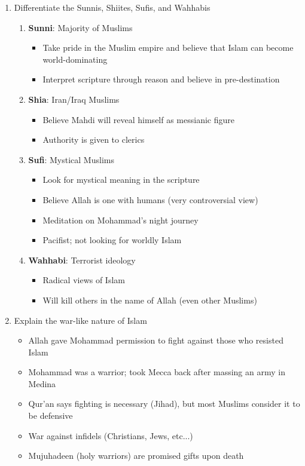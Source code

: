 \documentclass[8pt]{article}
\begin{document}
\begin{enumerate}
        \item Differentiate the Sunnis, Shiites, Sufis, and Wahhabis
            \begin{enumerate}
                \item \textbf{Sunni}: Majority of Muslims
                \begin{itemize}
                    \item Take pride in the Muslim empire and believe that Islam can become world-dominating
                    \item Interpret scripture through reason and believe in pre-destination
                \end{itemize}
                \item \textbf{Shia}: Iran/Iraq Muslims
                \begin{itemize}
                    \item Believe Mahdi will reveal himself as messianic figure
                    \item Authority is given to clerics
                \end{itemize}
                \item \textbf{Sufi}: Mystical Muslims
                \begin{itemize}
                    \item Look for mystical meaning in the scripture
                    \item Believe Allah is one with humans (very controversial view)
                    \item Meditation on Mohammad's night journey
                    \item Pacifist; not looking for worldly Islam
                \end{itemize}
                \item \textbf{Wahhabi}: Terrorist ideology
                \begin{itemize}
                    \item Radical views of Islam
                    \item Will kill others in the name of Allah (even other Muslims)
                \end{itemize}
            \end{enumerate}

        \item Explain the war-like nature of Islam
            \begin{itemize}
                \item Allah gave Mohammad permission to fight against those who resisted Islam
                \item Mohammad was a warrior; took Mecca back after massing an army in Medina
                \item Qur'an says fighting is necessary (Jihad), but most Muslims consider it to be defensive
                \item War against infidels (Christians, Jews, etc...)
                \item Mujuhadeen (holy warriors) are promised gifts upon death
            \end{itemize}


\end{enumerate}
\end{document}
